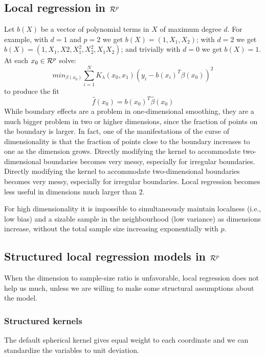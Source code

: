 \documentclass[12pt, letterpaper]{article}
\theoremstyle{definition}
\begin{document}
\subsection{Local regression in $\CMcal{R}^p$}
Let $b(X)$ be a vector of polynomial terms in $X$ of maximum degree $d$. For example, with $d = 1$ and $p = 2$ we get $b(X) = (1,X_1,X_2)$; with $d = 2$ we get $b(X) = (1, X_1, X2, X_1^2, X_2^2, X_1X_2)$; and trivially with $d = 0$ we get $b(X) = 1$. At each $x_0 \in \CMcal{R}^p$ solve:
\begin{equation}
min_{\beta(x_0)} \sum_{i=1}^N K_\lambda (x_0, x_1)\left(y_i - b(x_i)^T\beta\left(x_0\right)\right)^2
\end{equation}
to produce the fit
\begin{equation}
\hat{f} (x_0) = b(x_0)^T\hat{\beta}(x_0)
\end{equation}
While boundary effects are a problem in one-dimensional smoothing, they are a much bigger problem in two or higher dimensions, since the fraction of points on the boundary is larger. In fact, one of the manifestations of the curse of dimensionality is that the fraction of points close to the boundary increases to one as the dimension grows. Directly modifying the kernel to accommodate two-dimensional boundaries becomes very messy, especially for irregular boundaries.  Directly modifying the kernel to accommodate two-dimensional boundaries becomes very messy, especially for irregular boundaries.
Local regression becomes less useful in dimensions much larger than $2$.

For high dimensionality it is impossible to simultaneously maintain localness (i.e., low bias) and a sizable sample in the neighbourhood (low variance) as dimensions increase, without the total sample size increasing exponentially with $p$.

\subsection{Structured local regression models in $\CMcal{R}^p$}
When the dimension to sample-size ratio is unfavorable, local regression does not help us much, unless we are willing to make some structural assumptions about the model.

\subsubsection{Structured kernels}
The default spherical kernel gives equal weight to each coordinate and we can standardize the variables to unit deviation.
\end{document}

